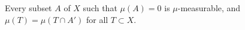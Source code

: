 Every subset $A$ of $X$ such that $\mu(A) = 0$ is $\mu$-measurable, and $\mu(T) = \mu(T \cap A')$ for all $T \subset X$.